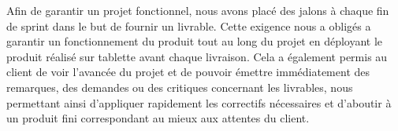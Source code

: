 Afin de garantir un projet fonctionnel, nous avons placé des jalons à chaque fin de sprint dans le but de fournir un livrable. Cette exigence nous a obligés a garantir un fonctionnement du produit tout au long du projet en déployant le produit réalisé sur tablette avant chaque livraison. Cela a également permis au client de voir l'avancée du projet et de pouvoir émettre immédiatement des remarques, des demandes ou des critiques concernant les livrables, nous permettant ainsi d'appliquer rapidement les correctifs nécessaires et d'aboutir à un produit fini correspondant au mieux aux attentes du client. 


